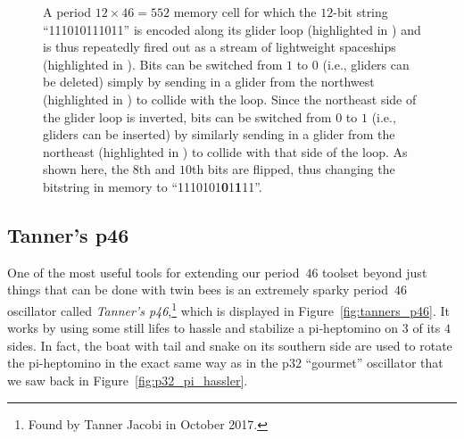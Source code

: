 \begin{figure}[!htb]
	\centering
	\caption{A period $12 \times 46 = 552$ memory cell for which the $12$-bit string ``111010111011'' is encoded along its glider loop (highlighted in ) and is thus repeatedly fired out as a stream of lightweight spaceships (highlighted in ). Bits can be switched from $1$ to $0$ (i.e., gliders can be deleted) simply by sending in a glider from the northwest (highlighted in ) to collide with the loop. Since the northeast side of the glider loop is inverted, bits can be switched from $0$ to $1$ (i.e., gliders can be inserted) by similarly sending in a glider from the northeast (highlighted in ) to collide with that side of the loop. As shown here, the $8$th and $10$th bits are flipped, thus changing the bitstring in memory to ``1110101\textbf{0}1\textbf{1}11''.}\label{fig:p46_memory_cell}
\end{figure}


\subsection{Tanner's p46}\label{sec:p46_tanner}

One of the most useful tools for extending our period~$46$ toolset beyond just things that can be done with twin bees is an extremely sparky period~$46$ oscillator called \emph{Tanner's p46},\footnote{Found by Tanner Jacobi in October 2017.} which is displayed
in Figure~\ref{fig:tanners_p46}. It works by using some still lifes to hassle and stabilize a pi-heptomino on $3$ of its $4$ sides. In fact, the boat with tail and snake on its southern side are used to rotate the pi-heptomino in the exact same way as in the p$32$ ``gourmet'' oscillator that we saw back in Figure~\ref{fig:p32_pi_hassler}.

